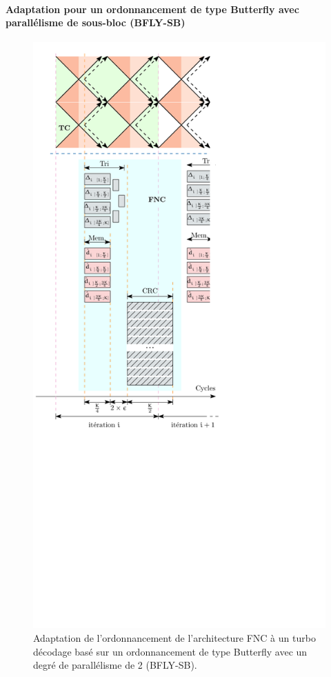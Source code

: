 \paragraph*{Adaptation pour un ordonnancement de type Butterfly avec parallélisme de sous-bloc (BFLY-SB)}
\begin{figure}[!ht]
	\centering
	\includegraphics{main/ch4_fig/ipe/fnc_bfly_sb.pdf}
	\caption{Adaptation de l'ordonnancement de l'architecture FNC à un turbo décodage basé sur un ordonnancement de type 
	Butterfly avec un degré de parallélisme de 2 (BFLY-SB). \label{fig:fnc_bfly_sb}}
\end{figure}
